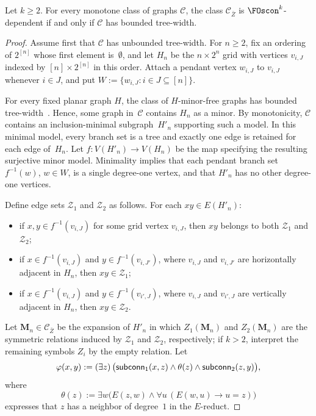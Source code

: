 \documentclass[1p,number,11pt]{elsarticle}
\newcommand{\scon}{\hbox{\sf subconn}}
\renewcommand{\phi}{\varphi}
\theoremstyle{plain}
\newcommand{\gstam}[1]{\marginpar{\scriptsize \tt Giannos> \textcolor{red}{\textsl{#1}}}}
\newcommand{\Cc}{\mathscr{C}}
\renewcommand{\geq}{\geqslant}
\begin{document}
\begin{theorem}
Let $k\geq2$. For every monotone class of graphs $\Cc$, the class
$\Cc_{\bar Z}$ is $\FOscon^k$-dependent if and only if $\Cc$ has bounded
tree-width.
\end{theorem}
\begin{proof}
Assume first that $\Cc$ has unbounded tree-width. For $n\geq2$, fix an
ordering of $2^{[n]}$ whose first element is~$\emptyset$, and let $H_n$ be
the $n\times2^n$ grid with vertices $v_{i,J}$ indexed by
$[n]\times2^{[n]}$ in this order. Attach a pendant vertex $w_{i,J}$ to
$v_{i,J}$ whenever $i\in J$, and put
$W:=\{w_{i,J}:i\in J\subseteq[n]\}$.

For every fixed planar graph $H$, the class of $H$-minor-free graphs has
bounded tree-width~\cite{RobertsonSGM5}.%
Hence, some graph in~$\Cc$ contains $H_n$ as a minor.
By monotonicity, $\Cc$ contains an inclusion-minimal subgraph~$H'_n$
supporting such a model. In this minimal model, every branch set is a tree
and exactly one edge is retained for each edge of~$H_n$. 
Let $f\colon V(H'_n)\to V(H_n)$ be the map specifying the resulting surjective minor model.
Minimality
implies that each pendant branch set $f^{-1}(w)$, $w\in W$, is a single
degree-one vertex, and that $H'_n$ has no other degree-one vertices.

Define edge sets $\mathcal Z_1$ and $\mathcal Z_2$ as follows. For each
$xy\in E(H'_n)$:
\begin{itemize}
    \item if $x,y\in f^{-1}(v_{i,J})$ for some grid vertex $v_{i,J}$,
    then $xy$ belongs to both $\mathcal Z_1$ and $\mathcal Z_2$;
    \item if $x\in f^{-1}(v_{i,J})$ and $y\in f^{-1}(v_{i,J'})$, where
    $v_{i,J}$ and $v_{i,J'}$ are horizontally adjacent in $H_n$, then
    $xy\in\mathcal Z_1$;
    \item if $x\in f^{-1}(v_{i,J})$ and $y\in f^{-1}(v_{i',J})$, where
    $v_{i,J}$ and $v_{i',J}$ are vertically adjacent in $H_n$, then
    $xy\in\mathcal Z_2$.
\end{itemize}
Let $\mathbf M_n\in\Cc_{\bar Z}$ be the expansion of $H'_n$ in which
$Z_1(\mathbf M_n)$ and $Z_2(\mathbf M_n)$ are the symmetric relations
induced by $\mathcal Z_1$ and $\mathcal Z_2$, respectively; if $k>2$,
interpret the remaining symbols $Z_i$ by the empty relation. Let
\[
\phi(x,y):=(\exists z)\,
   \bigl(\scon_1(x,z)\wedge\theta(z)\wedge\scon_2(z,y)\bigr),
\]
where
\[
   \theta(z):=
   \exists w\bigl(E(z,w)\wedge
   \forall u\,(E(w,u)\rightarrow u=z)\bigr)
\]
expresses that $z$ has a neighbor of degree~$1$ in the $E$-reduct.


\end{proof}
\end{document}
